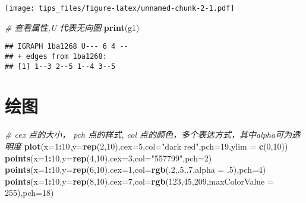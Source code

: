 \documentclass[hyperref,]{ctexart}
\newenvironment{Shaded}{\begin{snugshade}}{\end{snugshade}}
\newcommand{\KeywordTok}[1]{\textcolor[rgb]{0.13,0.29,0.53}{\textbf{#1}}}
\newcommand{\DataTypeTok}[1]{\textcolor[rgb]{0.13,0.29,0.53}{#1}}
\newcommand{\DecValTok}[1]{\textcolor[rgb]{0.00,0.00,0.81}{#1}}
\newcommand{\StringTok}[1]{\textcolor[rgb]{0.31,0.60,0.02}{#1}}
\newcommand{\CommentTok}[1]{\textcolor[rgb]{0.56,0.35,0.01}{\textit{#1}}}
\newcommand{\OperatorTok}[1]{\textcolor[rgb]{0.81,0.36,0.00}{\textbf{#1}}}
\newcommand{\NormalTok}[1]{#1}
\begin{document}
\texttt{[image: tips\_files/figure-latex/unnamed-chunk-2-1.pdf]}

\begin{Shaded}
\begin{Highlighting}[]
\CommentTok{# 查看属性,U 代表无向图   }
\KeywordTok{print}\NormalTok{(g1)}
\end{Highlighting}
\end{Shaded}

\begin{verbatim}
## IGRAPH 1ba1268 U--- 6 4 -- 
## + edges from 1ba1268:
## [1] 1--3 2--5 1--4 3--5
\end{verbatim}

\section{绘图}

\begin{Shaded}
\begin{Highlighting}[]
\CommentTok{# cex 点的大小， pch 点的样式, col 点的颜色，多个表达方式，其中alpha可为透明度}
\KeywordTok{plot}\NormalTok{(}\DataTypeTok{x=}\DecValTok{1}\OperatorTok{:}\DecValTok{10}\NormalTok{,}\DataTypeTok{y=}\KeywordTok{rep}\NormalTok{(}\DecValTok{2}\NormalTok{,}\DecValTok{10}\NormalTok{),}\DataTypeTok{cex=}\DecValTok{5}\NormalTok{,}\DataTypeTok{col=}\StringTok{"dark red"}\NormalTok{,}\DataTypeTok{pch=}\DecValTok{19}\NormalTok{,}\DataTypeTok{ylim =} \KeywordTok{c}\NormalTok{(}\DecValTok{0}\NormalTok{,}\DecValTok{10}\NormalTok{))}
\KeywordTok{points}\NormalTok{(}\DataTypeTok{x=}\DecValTok{1}\OperatorTok{:}\DecValTok{10}\NormalTok{,}\DataTypeTok{y=}\KeywordTok{rep}\NormalTok{(}\DecValTok{4}\NormalTok{,}\DecValTok{10}\NormalTok{),}\DataTypeTok{cex=}\DecValTok{3}\NormalTok{,}\DataTypeTok{col=}\StringTok{"557799"}\NormalTok{,}\DataTypeTok{pch=}\DecValTok{2}\NormalTok{)}
\KeywordTok{points}\NormalTok{(}\DataTypeTok{x=}\DecValTok{1}\OperatorTok{:}\DecValTok{10}\NormalTok{,}\DataTypeTok{y=}\KeywordTok{rep}\NormalTok{(}\DecValTok{6}\NormalTok{,}\DecValTok{10}\NormalTok{),}\DataTypeTok{cex=}\DecValTok{1}\NormalTok{,}\DataTypeTok{col=}\KeywordTok{rgb}\NormalTok{(.}\DecValTok{2}\NormalTok{,.}\DecValTok{5}\NormalTok{,.}\DecValTok{7}\NormalTok{,}\DataTypeTok{alpha =}\NormalTok{ .}\DecValTok{5}\NormalTok{),}\DataTypeTok{pch=}\DecValTok{4}\NormalTok{)}
\KeywordTok{points}\NormalTok{(}\DataTypeTok{x=}\DecValTok{1}\OperatorTok{:}\DecValTok{10}\NormalTok{,}\DataTypeTok{y=}\KeywordTok{rep}\NormalTok{(}\DecValTok{8}\NormalTok{,}\DecValTok{10}\NormalTok{),}\DataTypeTok{cex=}\DecValTok{7}\NormalTok{,}\DataTypeTok{col=}\KeywordTok{rgb}\NormalTok{(}\DecValTok{123}\NormalTok{,}\DecValTok{45}\NormalTok{,}\DecValTok{209}\NormalTok{,}\DataTypeTok{maxColorValue =} \DecValTok{255}\NormalTok{),}\DataTypeTok{pch=}\DecValTok{18}\NormalTok{)}
\end{Highlighting}
\end{Shaded}
\end{document}

